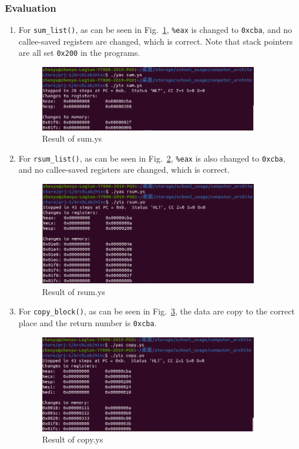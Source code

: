 \documentclass{article}
\begin{document}
\subsubsection{Evaluation}
\begin{enumerate}
    \item For \lstinline{sum_list()}, as can be seen in Fig.~\ref{fig:sum_res}, \lstinline{%eax} is changed to \lstinline{0xcba}, and no callee-saved registers are changed, which is correct. Note that stack pointers are all set \lstinline{0x200} in the programs.
    \begin{figure}[h]
        \centering
        \includegraphics[width=0.9\textwidth]{sum_res.png}
        \caption{Result of sum.ys}
        \label{fig:sum_res}
    \end{figure}
    \item For \lstinline{rsum_list()}, as can be seen in Fig.~\ref{fig:rsum_res}, \lstinline{%eax} is also changed to \lstinline{0xcba}, and no callee-saved registers are changed, which is correct.
    \begin{figure}[h]
        \centering
        \includegraphics[width=0.9\textwidth]{rsum_res.png}
        \caption{Result of rsum.ys}
        \label{fig:rsum_res}
    \end{figure}
    \item For \lstinline{copy_block()}, as can be seen in Fig.~\ref{fig:copy_res}, the data are copy to the correct place and the return number is \lstinline{0xcba}.
    \begin{figure}[h]
        \centering
        \includegraphics[width=0.9\textwidth]{copy_res.png}
        \caption{Result of copy.ys}
        \label{fig:copy_res}
    \end{figure}
\end{enumerate}
\end{document}
